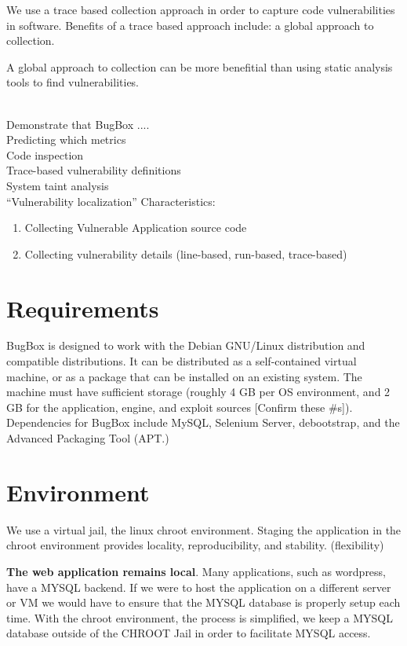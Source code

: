 \documentclass[letterpaper,twocolumn,10pt]{article}
\begin{document}
We use a trace based collection approach in order to capture code vulnerabilities in software.  Benefits of a trace based approach include:  a global approach to collection.

A global approach to collection can be more benefitial than using static analysis tools to find vulnerabilities.   

 \\
Demonstrate that BugBox ....\\
Predicting which metrics  \\

\noindent Code inspection\\
Trace-based vulnerability definitions\\
System taint analysis\\

\noindent ``Vulnerability localization'' Characteristics:
 \begin{enumerate} 
	\item Collecting Vulnerable Application source code
	\item Collecting vulnerability details (line-based, run-based, trace-based)
 \end{enumerate}

\section{Requirements}

BugBox is designed to work with the Debian GNU/Linux distribution and compatible distributions.  It can be distributed as a self-contained virtual machine, or as a package that can be installed on an existing system. The machine must have sufficient storage (roughly 4 GB per OS environment, and 2 GB for the application, engine, and exploit sources [Confirm these \#s]).  Dependencies for BugBox include MySQL,  Selenium Server, debootstrap, and the Advanced Packaging Tool (APT.)\par

\section{Environment}

We use a virtual jail, the linux chroot environment.  Staging the application in the chroot environment provides locality, reproducibility, and stability.  (flexibility)

{\bf The web application remains local}.  Many applications, such as wordpress, have a MYSQL backend.  If we were to host the application on a different server or VM we would have to ensure that the MYSQL database is properly setup each time.  With the chroot environment, the process is simplified, we keep a MYSQL database outside of the CHROOT Jail in order to facilitate MYSQL access.  
\end{document}
